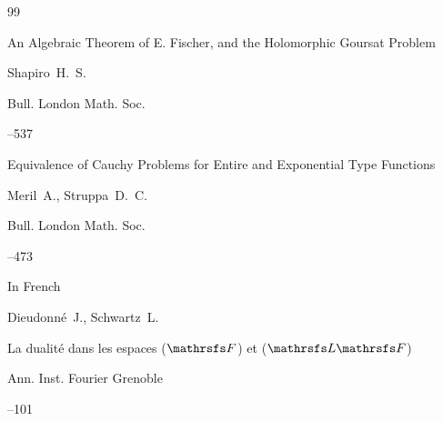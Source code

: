 \begin{thebibliography}{99}

\paper An Algebraic Theorem of E. Fischer, and the Holomorphic Goursat Problem

\by Shapiro~H.~S.

\jour Bull. London Math. Soc.




--537





\paper Equivalence of Cauchy Problems for Entire and Exponential Type Functions

\by Meril~A., Struppa~D.~C.

\jour  Bull. London Math. Soc.




--473







\lang In French

\by Dieudonn\'e~J., Schwartz~L.

\paper La dualit\'e dans les espaces ($\mathrsfs F$) et ($\mathrsfs L \mathrsfs F$)



\jour  Ann. Inst. Fourier Grenoble 


--101 






\end{thebibliography}



\EngDate







\newpage

\Russian



%




% 

